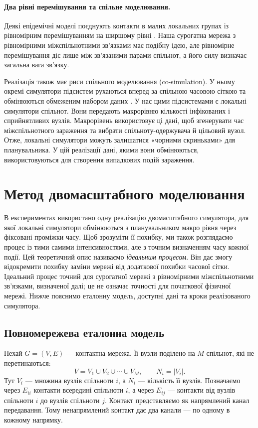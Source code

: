 \paragraph{Два рівні перемішування та спільне моделювання.}
Деякі епідемічні моделі поєднують контакти в малих локальних групах із рівномірним перемішуванням на ширшому рівні \citep{ball1997}. Наша сурогатна мережа з рівномірними міжспільнотними зв’язками має подібну ідею, але рівномірне перемішування діє лише між зв'язаними парами спільнот, а його силу визначає загальна вага зв'язку.

Реалізація також має риси спільного моделювання (co-simulation). У ньому окремі симулятори підсистем рухаються вперед за спільною часовою сіткою та обмінюються обмеженим набором даних \citep{gomes2018cosim}. У нас цими підсистемами є локальні симулятори спільнот. Вони передають макрорівню кількості інфікованих і сприйнятливих вузлів. Макрорівень використовує ці дані, щоб згенерувати час міжспільнотного зараження та вибрати спільноту-одержувача й цільовий вузол. Отже, локальні симулятори можуть залишатися «чорними скриньками» для планувальника. У цій реалізації дані, якими вони обмінюються, використовуються для створення випадкових подій зараження.

\section{Метод двомасштабного моделювання}
\label{sec:method}

В експериментах використано одну реалізацію двомасштабного симулятора, для якої локальні симулятори обмінюються з планувальником макро рівня через фіксовані проміжки часу. Щоб зрозуміти її похибку, ми також розглядаємо процес із тими самими інтенсивностями, але з точним визначенням часу кожної події. Цей теоретичний опис називаємо \emph{ідеальним процесом}. Він дає змогу відокремити похибку заміни мережі від додаткової похибки часової сітки. Ідеальний процес точний для сурогатної мережі з рівномірними міжспільнотними зв’язками, визначеної далі; це не означає точності для початкової фізичної мережі. Нижче пояснимо еталонну модель, доступні дані та кроки реалізованого симулятора.

\subsection{Повномережева еталонна модель}
\label{sec:reference}

Нехай $G=(V,E)$ --- контактна мережа. Її вузли поділено на $M$ спільнот, які не перетинаються:
\begin{equation}
\label{eq:partition}
V=V_1\cup V_2\cup\cdots\cup V_M,
\qquad N_i=|V_i|.
\end{equation}
Тут $V_i$ --- множина вузлів спільноти $i$, а $N_i$ --- кількість її вузлів. Позначаємо через $E_{ii}$ контакти всередині спільноти $i$, а через $E_{ij}$ --- контакти від вузлів спільноти $i$ до вузлів спільноти $j$. Контакт представляємо як напрямлений канал передавання. Тому ненапрямлений контакт дає два канали --- по одному в кожному напрямку.

